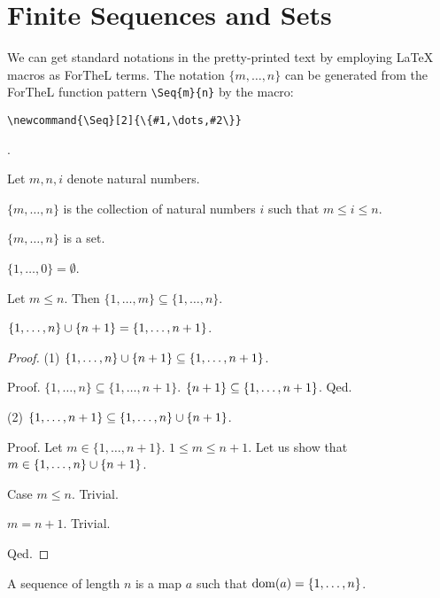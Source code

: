\documentclass[11pt]{article}
\newcommand{\Seq}[2]{\{#1,\dots,#2\}}
\begin{document}
\section{Finite Sequences and Sets}

We can get standard notations in the pretty-printed
text by employing \LaTeX{} macros as ForTheL terms.
The notation $\Seq{m}{n}$ can be generated 
from the ForTheL function pattern
\verb+\Seq{m}{n}+ 
by the 
macro:
\begin{verbatim}
\newcommand{\Seq}[2]{\{#1,\dots,#2\}}
\end{verbatim}.

\begin{forthel}

Let $m,n,i$ denote natural numbers.

\begin{definition}
$\Seq{m}{n}$ is the collection of
natural numbers $i$ such that $m \leq i \leq n$.
\end{definition}

\begin{lemma}
$\Seq{m}{n}$ is a set.
\end{lemma}

\begin{lemma}
$\Seq{1}{0} = \emptyset$.
\end{lemma}

\begin{lemma}
Let $m \leq n$. Then $\Seq{1}{m} \subseteq \Seq{1}{n}$.
\end{lemma}

\begin{lemma}
$\Seq{1}{n} \cup \sing{n+1} = \Seq{1}{n+1}$.
\end{lemma}
\begin{proof}

(1) $\Seq{1}{n} \cup \sing{n+1} \subseteq \Seq{1}{n+1}$.

Proof. $\Seq{1}{n} \subseteq \Seq{1}{n+1}$.
$\sing{n+1} \subseteq \Seq{1}{n+1}$.
Qed.

(2) $\Seq{1}{n+1} \subseteq \Seq{1}{n} \cup \sing{n+1}$.

Proof.
Let $m \in \Seq{1}{n+1}$. $1 \leq m \leq n+1$. Let us show that 
$m \in \Seq{1}{n} \cup \sing{n+1}$.

Case $m \leq n$. Trivial.

$m = n+1$. Trivial.

Qed.

\end{proof}

\begin{definition}
A sequence of length $n$ is a
map $a$ such that $\dom(a) = \Seq{1}{n}$.
\end{definition}


\end{forthel}
\end{document}
